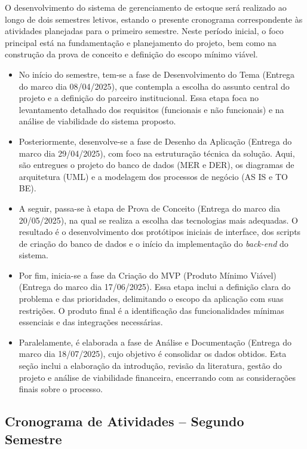 \documentclass[
	12pt,				%
	openany,			%
	twoside,			%
	a4paper,			%
	english,			%
	brazil				%
	]{abntex2}
\begin{document}
O desenvolvimento do sistema de gerenciamento de estoque será realizado ao longo de dois semestres letivos, estando o presente cronograma correspondente às atividades planejadas para o primeiro semestre. Neste período inicial, o foco principal está na fundamentação e planejamento do projeto, bem como na construção da prova de conceito e definição do escopo mínimo viável.

\begin{itemize}

\item No início do semestre, tem-se a fase de Desenvolvimento do Tema (Entrega do marco dia 08/04/2025), que contempla a escolha do assunto central do projeto e a definição do parceiro institucional. Essa etapa foca no levantamento detalhado dos requisitos (funcionais e não funcionais) e na análise de viabilidade do sistema proposto.

\item Posteriormente, desenvolve-se a fase de Desenho da Aplicação (Entrega do marco dia 29/04/2025), com foco na estruturação técnica da solução. Aqui, são entregues o projeto do banco de dados (MER e DER), os diagramas de arquitetura (UML) e a modelagem dos processos de negócio (AS IS e TO BE).

\item A seguir, passa-se à etapa de Prova de Conceito (Entrega do marco dia 20/05/2025), na qual se realiza a escolha das tecnologias mais adequadas. O resultado é o desenvolvimento dos protótipos iniciais de interface, dos scripts de criação do banco de dados e o início da implementação do \textit{back-end} do sistema.

\item Por fim, inicia-se a fase da Criação do MVP (Produto Mínimo Viável) (Entrega do marco dia 17/06/2025). Essa etapa inclui a definição clara do problema e das prioridades, delimitando o escopo da aplicação com suas restrições. O produto final é a identificação das funcionalidades mínimas essenciais e das integrações necessárias.

\item Paralelamente, é elaborada a fase de Análise e Documentação (Entrega do marco dia 18/07/2025), cujo objetivo é consolidar os dados obtidos. Esta seção inclui a elaboração da introdução, revisão da literatura, gestão do projeto e análise de viabilidade financeira, encerrando com as considerações finais sobre o processo.
\end{itemize}

\subsection{Cronograma de Atividades – Segundo Semestre}
\end{document}
